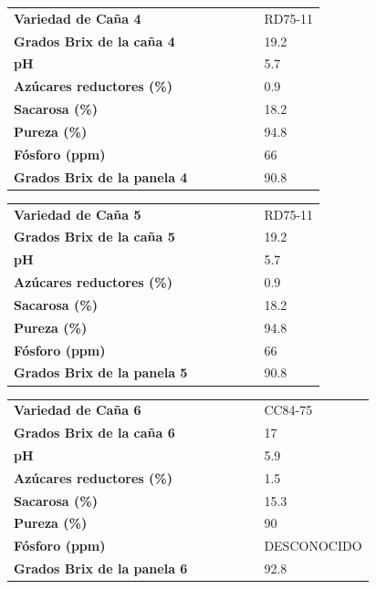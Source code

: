 \documentclass{article}%
\begin{document}
\linebreak%
\newline%
%
\linebreak%
\begin{tabular}{lcccccl}%
\textbf{Variedad de Caña 4}& & & & & &RD75{-}11\\%
\textbf{Grados Brix de la caña 4}& & & & & &19.2\\%
\textbf{pH}& & & & & &5.7\\%
\textbf{Azúcares reductores (\%)}& & & & & &0.9\\%
\textbf{Sacarosa (\%)}& & & & & &18.2\\%
\textbf{Pureza (\%)}& & & & & &94.8\\%
\textbf{Fósforo (ppm)}& & & & & &66\\%
\textbf{Grados Brix de la panela 4}& & & & & &90.8\\%
\end{tabular}%
\linebreak%
\newline%
%
\linebreak%
\begin{tabular}{lcccccl}%
\textbf{Variedad de Caña 5}& & & & & &RD75{-}11\\%
\textbf{Grados Brix de la caña 5}& & & & & &19.2\\%
\textbf{pH}& & & & & &5.7\\%
\textbf{Azúcares reductores (\%)}& & & & & &0.9\\%
\textbf{Sacarosa (\%)}& & & & & &18.2\\%
\textbf{Pureza (\%)}& & & & & &94.8\\%
\textbf{Fósforo (ppm)}& & & & & &66\\%
\textbf{Grados Brix de la panela 5}& & & & & &90.8\\%
\end{tabular}%
\linebreak%
\newline%
%
\linebreak%
\begin{tabular}{lcccccl}%
\textbf{Variedad de Caña 6}& & & & & &CC84{-}75\\%
\textbf{Grados Brix de la caña 6}& & & & & &17\\%
\textbf{pH}& & & & & &5.9\\%
\textbf{Azúcares reductores (\%)}& & & & & &1.5\\%
\textbf{Sacarosa (\%)}& & & & & &15.3\\%
\textbf{Pureza (\%)}& & & & & &90\\%
\textbf{Fósforo (ppm)}& & & & & &DESCONOCIDO\\%
\textbf{Grados Brix de la panela 6}& & & & & &92.8\\%
\end{tabular}%
\end{document}
